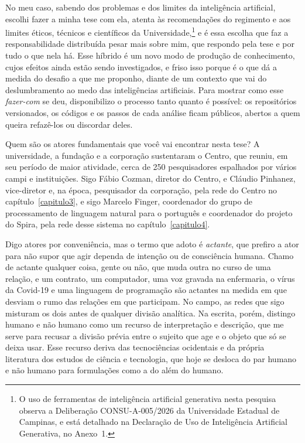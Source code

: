 No meu caso, sabendo dos problemas e dos limites da inteligência artificial, escolhi fazer a minha tese com ela, atenta às recomendações do regimento e aos limites éticos, técnicos e científicos da Universidade,\footnote{O uso de ferramentas de inteligência artificial generativa nesta pesquisa observa a Deliberação CONSU-A-005/2026 da Universidade Estadual de Campinas, e está detalhado na Declaração de Uso de Inteligência Artificial Generativa, no Anexo~1.} e é essa escolha que faz a responsabilidade distribuída pesar mais sobre mim, que respondo pela tese e por tudo o que nela há. Esse híbrido é um novo modo de produção de conhecimento, cujos efeitos ainda estão sendo investigados, e friso isso porque é o que dá a medida do desafio a que me proponho, diante de um contexto que vai do deslumbramento ao medo das inteligências artificiais. Para mostrar como esse \textit{fazer-com} se deu, disponibilizo o processo tanto quanto é possível: os repositórios versionados, os códigos e os passos de cada análise ficam públicos, abertos a quem queira refazê-los ou discordar deles.

Quem são os atores fundamentais que você vai encontrar nesta tese? A universidade, a fundação e a corporação sustentaram o Centro, que reuniu, em seu período de maior atividade, cerca de 250 pesquisadores espalhados por vários campi e instituições. Sigo Fábio Cozman, diretor do Centro, e Cláudio Pinhanez, vice-diretor e, na época, pesquisador da corporação, pela rede do Centro no capítulo~\ref{capitulo3}, e sigo Marcelo Finger, coordenador do grupo de processamento de linguagem natural para o português e coordenador do projeto do Spira, pela rede desse sistema no capítulo~\ref{capitulo4}.

Digo atores por conveniência, mas o termo que adoto é \emph{actante}, que prefiro a ator para não supor que agir dependa de intenção ou de consciência humana. Chamo de actante qualquer coisa, gente ou não, que muda outra no curso de uma relação, e um contrato, um computador, uma voz gravada na enfermaria, o vírus da Covid-19 e uma linguagem de programação são actantes na medida em que desviam o rumo das relações em que participam. No campo, as redes que sigo misturam os dois antes de qualquer divisão analítica. Na escrita, porém, distingo humano e não humano como um recurso de interpretação e descrição, que me serve para recusar a divisão prévia entre o sujeito que age e o objeto que só se deixa usar. Esse recurso deriva das tecnociências ocidentais e da própria literatura dos estudos de ciência e tecnologia, que hoje se desloca do par humano e não humano para formulações como a do além do humano.

